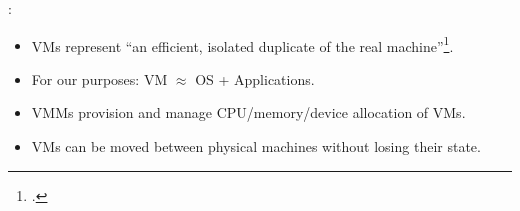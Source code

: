\documentclass[aspectratio=169]{beamer}
\begin{document}

\begin{frame}{\insertsectionhead: \insertsubsectionhead}
    \begin{itemize}
        \item
            VMs represent \enquote{an efficient, isolated duplicate of the real machine}\footcite{popek_vm_1974}.

        \item
            For our purposes: VM \(\approx\) OS + Applications.

        \item
            VMMs provision and manage CPU/memory/device allocation of VMs.

        \item
            VMs can be moved between physical machines without losing their state.
    \end{itemize}
\end{frame}

\end{document}
